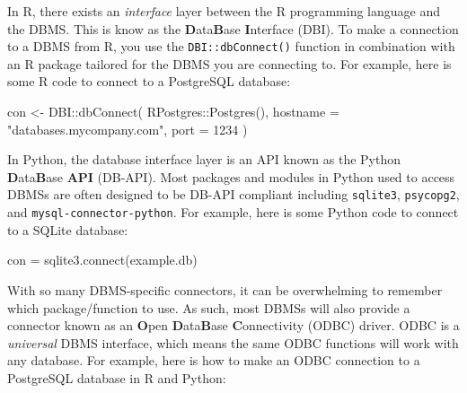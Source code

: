 \documentclass[
  letterpaper,
  DIV=11,
  numbers=noendperiod]{scrreprt}
\newenvironment{Shaded}{\begin{snugshade}}{\end{snugshade}}
\newcommand{\AttributeTok}[1]{\textcolor[rgb]{0.40,0.45,0.13}{#1}}
\newcommand{\DecValTok}[1]{\textcolor[rgb]{0.68,0.00,0.00}{#1}}
\newcommand{\ExtensionTok}[1]{\textcolor[rgb]{0.00,0.23,0.31}{#1}}
\newcommand{\FunctionTok}[1]{\textcolor[rgb]{0.28,0.35,0.67}{#1}}
\newcommand{\NormalTok}[1]{\textcolor[rgb]{0.00,0.23,0.31}{#1}}
\newcommand{\OperatorTok}[1]{\textcolor[rgb]{0.37,0.37,0.37}{#1}}
\newcommand{\OtherTok}[1]{\textcolor[rgb]{0.00,0.23,0.31}{#1}}
\newcommand{\SpecialCharTok}[1]{\textcolor[rgb]{0.37,0.37,0.37}{#1}}
\newcommand{\StringTok}[1]{\textcolor[rgb]{0.13,0.47,0.30}{#1}}
\begin{document}
In R, there exists an \emph{interface} layer between the R programming
language and the DBMS. This is know as the \textbf{D}ata\textbf{B}ase
\textbf{I}nterface (DBI). To make a connection to a DBMS from R, you use
the \texttt{DBI::dbConnect()} function in combination with an R package
tailored for the DBMS you are connecting to. For example, here is some R
code to connect to a PostgreSQL database:

\begin{Shaded}
\begin{Highlighting}[]
\NormalTok{con }\OtherTok{\textless{}{-}}\NormalTok{ DBI}\SpecialCharTok{::}\FunctionTok{dbConnect}\NormalTok{(}
\NormalTok{  RPostgres}\SpecialCharTok{::}\FunctionTok{Postgres}\NormalTok{(), }
  \AttributeTok{hostname =} \StringTok{"databases.mycompany.com"}\NormalTok{, }
  \AttributeTok{port =} \DecValTok{1234}
\NormalTok{)}
\end{Highlighting}
\end{Shaded}

In Python, the database interface layer is an API known as the Python
\textbf{D}ata\textbf{B}ase \textbf{API} (DB-API). Most packages and
modules in Python used to access DBMSs are often designed to be DB-API
compliant including \texttt{sqlite3}, \texttt{psycopg2}, and
\texttt{mysql-connector-python}. For example, here is some Python code
to connect to a SQLite database:

\begin{Shaded}
\begin{Highlighting}[]
\NormalTok{con }\OperatorTok{=}\NormalTok{ sqlite3.}\ExtensionTok{connect}\NormalTok{(}\StringTok{\textquotesingle{}example.db\textquotesingle{}}\NormalTok{)}
\end{Highlighting}
\end{Shaded}

With so many DBMS-specific connectors, it can be overwhelming to
remember which package/function to use. As such, most DBMSs will also
provide a connector known as an \textbf{O}pen \textbf{D}ata\textbf{B}ase
\textbf{C}onnectivity (ODBC) driver. ODBC is a \emph{universal} DBMS
interface, which means the same ODBC functions will work with any
database. For example, here is how to make an ODBC connection to a
PostgreSQL database in R and Python:
\end{document}
